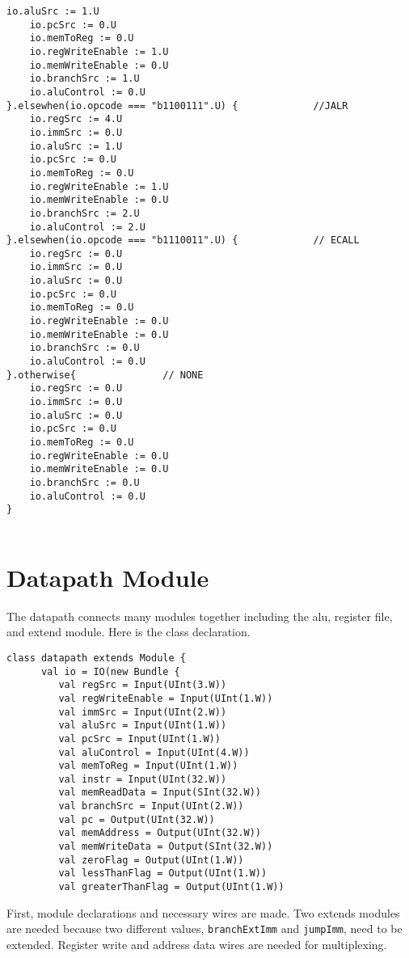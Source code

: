 \documentclass[12pt, letterpaper]{report}
\begin{document}
\noindent\begin{lstlisting}[style=scala]
    io.aluSrc := 1.U
    io.pcSrc := 0.U
    io.memToReg := 0.U
    io.regWriteEnable := 1.U
    io.memWriteEnable := 0.U
    io.branchSrc := 1.U
    io.aluControl := 0.U
}.elsewhen(io.opcode === "b1100111".U) {             //JALR
    io.regSrc := 4.U
    io.immSrc := 0.U
    io.aluSrc := 1.U
    io.pcSrc := 0.U
    io.memToReg := 0.U
    io.regWriteEnable := 1.U
    io.memWriteEnable := 0.U
    io.branchSrc := 2.U
    io.aluControl := 2.U
}.elsewhen(io.opcode === "b1110011".U) {             // ECALL
    io.regSrc := 0.U
    io.immSrc := 0.U
    io.aluSrc := 0.U
    io.pcSrc := 0.U
    io.memToReg := 0.U
    io.regWriteEnable := 0.U
    io.memWriteEnable := 0.U
    io.branchSrc := 0.U
    io.aluControl := 0.U    
}.otherwise{               // NONE
    io.regSrc := 0.U
    io.immSrc := 0.U
    io.aluSrc := 0.U
    io.pcSrc := 0.U
    io.memToReg := 0.U
    io.regWriteEnable := 0.U
    io.memWriteEnable := 0.U
    io.branchSrc := 0.U
    io.aluControl := 0.U
}
    
\end{lstlisting}

\pagebreak
\section{Datapath Module}
The datapath connects many modules together including the alu, register file, and extend module.
Here is the class declaration.

\begin{lstlisting}[style=scala]
   class datapath extends Module {
      val io = IO(new Bundle {
         val regSrc = Input(UInt(3.W))
         val regWriteEnable = Input(UInt(1.W))
         val immSrc = Input(UInt(2.W))
         val aluSrc = Input(UInt(1.W))
         val pcSrc = Input(UInt(1.W))
         val aluControl = Input(UInt(4.W))
         val memToReg = Input(UInt(1.W))
         val instr = Input(UInt(32.W))
         val memReadData = Input(SInt(32.W))
         val branchSrc = Input(UInt(2.W))
         val pc = Output(UInt(32.W))
         val memAddress = Output(UInt(32.W))
         val memWriteData = Output(SInt(32.W))
         val zeroFlag = Output(UInt(1.W))
         val lessThanFlag = Output(UInt(1.W))
         val greaterThanFlag = Output(UInt(1.W))
\end{lstlisting}

\noindent First, module declarations and necessary wires are made. Two extends modules are needed because 
two different values, \verb|branchExtImm| and \verb|jumpImm|, need to be extended. Register write and address data wires are needed for multiplexing.
\end{document}
